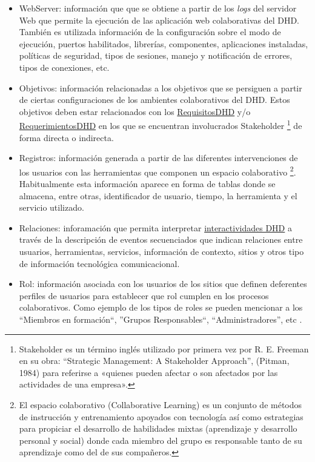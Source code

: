 \begin{itemize}
 \item WebServer: información que que se obtiene a partir de los \textit{logs}
del
servidor Web que permite la ejecución de las aplicación web colaborativas del
DHD. También es utilizada información de la configuración  sobre el modo
de ejecución, puertos habilitados, librerías, componentes, aplicaciones
instaladas, políticas de seguridad, tipos de sesiones, manejo y notificación
de errores, tipos de conexiones, etc.

\item Objetivos: información relacionadas a los objetivos que se persiguen a
partir de ciertas configuraciones de los ambientes colaborativos del DHD. Estos
objetivos deben estar relacionados con los
\hyperref[requisitosdhd]{RequisitosDHD}
y/o \hyperref[requerimientosdhd]{RequerimientosDHD}
en los que se encuentran involucrados Stakeholder \footnote{Stakeholder es un
término inglés utilizado por primera vez por R. E. Freeman en su obra:
“Strategic Management: A Stakeholder Approach”, (Pitman, 1984) para referirse a
«quienes pueden afectar o son afectados por las actividades de una empresa».} de
forma directa o indirecta. 

\item Registros: información generada a partir de las diferentes
intervenciones de los usuarios con las herramientas que componen un espacio
colaborativo \footnote{El espacio colaborativo (Collaborative Learning) es
un conjunto de métodos de instrucción y entrenamiento apoyados con tecnología
así como estrategias para propiciar el desarrollo de habilidades mixtas
(aprendizaje y desarrollo personal y social) donde cada miembro del grupo es
responsable tanto de su aprendizaje como del de sus compañeros.}. Habitualmente
esta información aparece en forma de tablas donde se almacena, entre otras,
identificador de usuario, tiempo, la herramienta y el servicio utilizado.

\item Relaciones: inforamación que permita interpretar
\hyperref[interactividadDHD]{interactividades DHD} a través de la
descripción de eventos secuenciados que indican relaciones entre usuarios,
herramientas, servicios, información de contexto, sitios y otros tipo de
información tecnológica comunicacional.

\item Rol: información asociada con los usuarios de los sitios que definen
deferentes perfiles de usuarios para establecer que rol cumplen en los procesos
colaborativos. Como ejemplo de los tipos de roles se pueden mencionar a los
``Miembros en formación``, ''Grupos Responsables``, ``Administradores'', etc
\cite{libro}.


\end{itemize}
